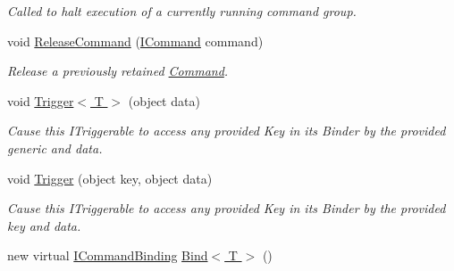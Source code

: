 \begin{DoxyCompactItemize}
\begin{DoxyCompactList}\small\item\em Called to halt execution of a currently running command group. \end{DoxyCompactList}\item 
void \hyperlink{classstrange_1_1extensions_1_1command_1_1impl_1_1_command_binder_a582e06f6f4dc8c94237e2e2c0d5e098c}{Release\-Command} (\hyperlink{interfacestrange_1_1extensions_1_1command_1_1api_1_1_i_command}{I\-Command} command)
\begin{DoxyCompactList}\small\item\em Release a previously retained \hyperlink{classstrange_1_1extensions_1_1command_1_1impl_1_1_command}{Command}. \end{DoxyCompactList}\item 
\hypertarget{classstrange_1_1extensions_1_1command_1_1impl_1_1_command_binder_a4e5f412df2d54ffd94571acadf6bf862}{void \hyperlink{classstrange_1_1extensions_1_1command_1_1impl_1_1_command_binder_a4e5f412df2d54ffd94571acadf6bf862}{Trigger$<$ T $>$} (object data)}\label{classstrange_1_1extensions_1_1command_1_1impl_1_1_command_binder_a4e5f412df2d54ffd94571acadf6bf862}

\begin{DoxyCompactList}\small\item\em Cause this I\-Triggerable to access any provided Key in its Binder by the provided generic and data. \end{DoxyCompactList}\item 
\hypertarget{classstrange_1_1extensions_1_1command_1_1impl_1_1_command_binder_af5ad5b130439533dda9731f857b33ab6}{void \hyperlink{classstrange_1_1extensions_1_1command_1_1impl_1_1_command_binder_af5ad5b130439533dda9731f857b33ab6}{Trigger} (object key, object data)}\label{classstrange_1_1extensions_1_1command_1_1impl_1_1_command_binder_af5ad5b130439533dda9731f857b33ab6}

\begin{DoxyCompactList}\small\item\em Cause this I\-Triggerable to access any provided Key in its Binder by the provided key and data. \end{DoxyCompactList}\item 
\hypertarget{classstrange_1_1extensions_1_1command_1_1impl_1_1_command_binder_a2ebf06f8c2b143f7af5475c851173808}{new virtual \hyperlink{interfacestrange_1_1extensions_1_1command_1_1api_1_1_i_command_binding}{I\-Command\-Binding} \hyperlink{classstrange_1_1extensions_1_1command_1_1impl_1_1_command_binder_a2ebf06f8c2b143f7af5475c851173808}{Bind$<$ T $>$} ()}\label{classstrange_1_1extensions_1_1command_1_1impl_1_1_command_binder_a2ebf06f8c2b143f7af5475c851173808}


\end{DoxyCompactItemize}
